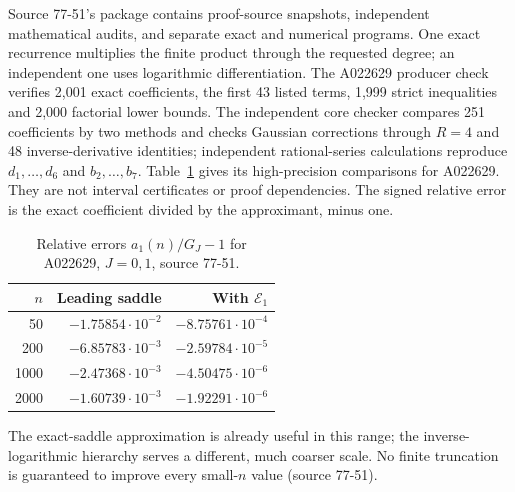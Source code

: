 \documentclass[11pt]{article}
\numberwithin{equation}{section}
\theoremstyle{definition}\newtheorem{definition}[theorem]{Definition}
\theoremstyle{remark}\newtheorem{remark}[theorem]{Remark}
\newcommand{\src}[1]{\textup{(source #1)}}
\begin{document}
Source 77-51's package contains proof-source snapshots, independent
mathematical audits, and separate exact and numerical programs.  One exact
recurrence multiplies the finite product through the requested degree; an
independent one uses logarithmic differentiation.  The A022629 producer check
verifies 2,001 exact coefficients, the first 43 listed terms, 1,999 strict
inequalities and 2,000 factorial lower bounds.  The independent core checker
compares 251 coefficients by two methods and checks Gaussian corrections
through $R=4$ and 48 inverse-derivative identities; independent
rational-series calculations reproduce $d_1,\dots,d_6$ and $b_2,\dots,b_7$.
Table~\ref{dpn:fp:tab:numerics} gives its high-precision comparisons for
A022629.  They are not interval certificates or proof dependencies.  The
signed relative error is the exact coefficient divided by the approximant,
minus one.
\begin{table}[!htbp]
\centering\small
\begin{tabular}{r rr}
\toprule
$n$ & Leading saddle & With $\mathcal E_1$\\
\midrule
50   & $-1.75854\cdot10^{-2}$ & $-8.75761\cdot10^{-4}$\\
200  & $-6.85783\cdot10^{-3}$ & $-2.59784\cdot10^{-5}$\\
1000 & $-2.47368\cdot10^{-3}$ & $-4.50475\cdot10^{-6}$\\
2000 & $-1.60739\cdot10^{-3}$ & $-1.92291\cdot10^{-6}$\\
\bottomrule
\end{tabular}
\caption{Relative errors $a_1(n)/G_J-1$ for A022629, $J=0,1$, source
77-51.}\label{dpn:fp:tab:numerics}
\end{table}
The exact-saddle approximation is already useful in this range; the
inverse-logarithmic hierarchy serves a different, much coarser scale.  No
finite truncation is guaranteed to improve every small-$n$ value
\src{77-51}.
\end{document}
